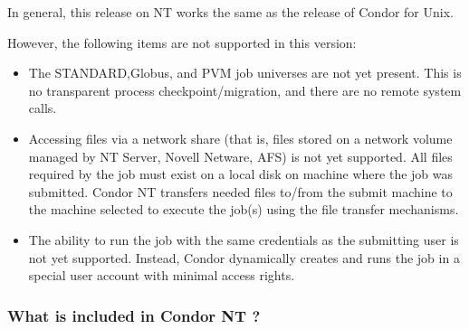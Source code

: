 In general, this release on NT works the same as the 
release of Condor for Unix.  

However, the following items are not supported in this version:

\begin{itemize}

\item The STANDARD,Globus, and PVM job universes are not yet present.  
This is no
transparent process checkpoint/migration, and there are no
remote system calls.

\item Accessing files via a network share (that is,
files stored on a network volume managed by NT Server, Novell Netware, AFS)
is not yet supported.
All files required by the job must exist on a local disk on
machine where the job was submitted.
Condor NT transfers 
needed files to/from the submit machine to the machine selected to
execute the job(s) using the file transfer mechanisms.

\item The ability to run the job with the same credentials as the submitting
user is not yet supported.  Instead, Condor dynamically creates and runs the
job in a special user account with minimal access rights.

\end{itemize}

\subsubsection{What is included in Condor NT \VersionNotice?}

